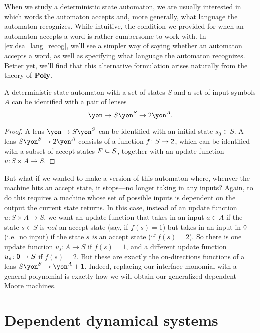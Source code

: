 \documentclass[Book-Poly]{subfiles}
\begin{document}
\begin{remark}
When we study a deterministic state automaton, we are usually interested in which words the automaton accepts and, more generally, what language the automaton recognizes.
While intuitive, the condition we provided for when an automaton accepts a word is rather cumbersome to work with.
In \cref{ex.dsa_lang_recog}, we'll see a simpler way of saying whether an automaton accepts a word, as well as specifying what language the automaton recognizes.
Better yet, we'll find that this alternative formulation arises naturally from the theory of $\poly$.
\end{remark}

\begin{proposition} \label{prop.dsa}
A deterministic state automaton with a set of states $S$ and a set of input symbols $A$ can be identified with a pair of lenses
\[
\yon\to S\yon^S\to \2\yon^A.
\]
\end{proposition}
\begin{proof}
A lens $\yon\to S\yon^S$ can be identified with an initial state $s_0\in S$.
A lens $S\yon^S\to\2\yon^A$ consists of a function $f\colon S\to\2$, which can be identified with a subset of accept states $F \ss S$, together with an update function $u \colon S\times A\to S$.
\end{proof}

But what if we wanted to make a version of this automaton where, whenver the machine hits an accept state, it stops---no longer taking in any inputs? Again, to do this requires a machine whose set of possible inputs is dependent on the output the current state returns.
In this case, instead of an update function $u\colon S\times A\to S$, we want an update function that takes in an input $a\in A$ if the state $s\in S$ is \emph{not} an accept state (say, if $f(s)=1$) but takes in an input in $\0$ (i.e.\ no input) if the state $s$ \emph{is} an accept state (if $f(s)=2$).
So there is one update function $u_s\colon A\to S$ if $f(s)=1$, and a different update function $u_s\colon\0\to S$ if $f(s)=2$.
But these are exactly the on-directions functions of a lens $S\yon^S\to\yon^A+\1$.
Indeed, replacing our interface monomial with a general polynomial is exactly how we will obtain our generalized dependent Moore machines.

\section{Dependent dynamical systems}\label{sec.poly.dyn_sys.depend_sys}
\end{document}

